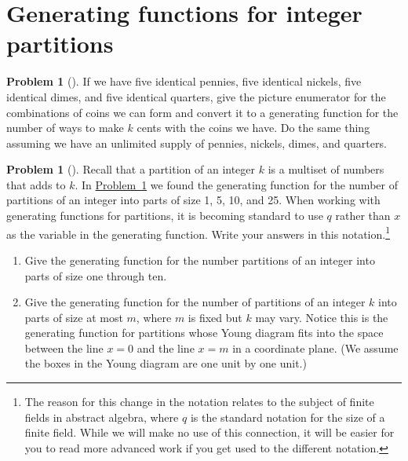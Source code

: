 \documentclass[10pt,]{book}
\theoremstyle{plain}
\theoremstyle{definition}
\newtheorem{activity}[project]{Problem}
\theoremstyle{definition}
\numberwithin{equation}{chapter}
\begin{document}
\section[{Generating functions for integer partitions}]{Generating functions for integer partitions}\label{sec_genfns-int-parts}
\begin{activity}[] \label{change-making}
If we have five identical pennies, five identical nickels, five identical dimes, and five identical quarters, give the picture enumerator for the combinations of coins we can form and convert it to a generating function for the number of ways to make \(k\) cents with the coins we have. Do the same thing assuming we have an unlimited supply of pennies, nickels, dimes, and quarters.%
\end{activity}
\begin{activity}[] \label{activity-201}
Recall that a partition of an integer \(k\) is a multiset of numbers that adds to \(k\). In \hyperref[change-making]{Problem~\ref{change-making}} we found the generating function for the number of partitions of an integer into parts of size 1, 5, 10, and 25. When working with generating functions for partitions, it is becoming standard to use \(q\) rather than \(x\) as the variable in the generating function.  Write your answers in this notation.\footnote{The reason for this change in the notation relates to the subject of finite fields in abstract algebra, where \(q\) is the standard notation for the size of a finite field.  While we will make no use of this connection, it will be easier for you to read more advanced work if you get used to the different notation.\label{fn-13}}%
\begin{enumerate}[font=\bfseries,label=(\alph*),ref=\alph*]
\item\label{task-139} \marginsymbol[-2.5em]{} Give the generating function for the number partitions of an integer into parts of size one through ten.%
\item\label{largestpartatmostm} \marginsymbol[-2.5em]{} Give the generating function for the number of partitions of an integer \(k\) into parts of size at most \(m\), where \(m\) is fixed but \(k\) may vary. Notice this is the generating function for partitions whose Young diagram fits into the space between the line \(x=0\) and the line \(x=m\) in a coordinate plane. (We assume the boxes in the Young diagram are one unit by one unit.)%
\end{enumerate}
\end{activity}
\end{document}
